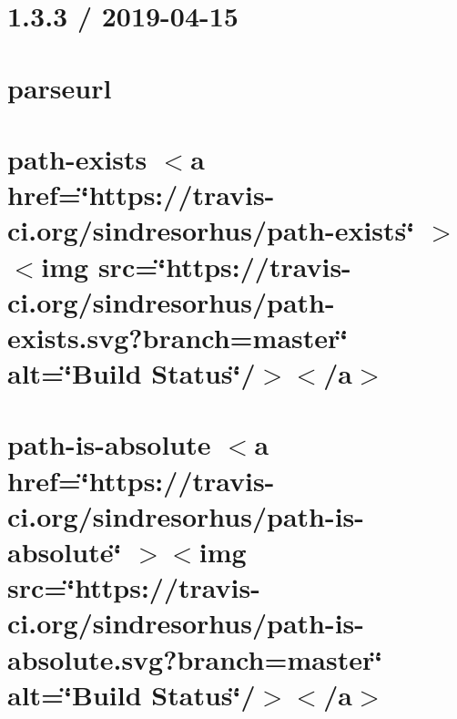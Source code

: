 \documentclass[twoside]{book}
\newcommand{\+}{\discretionary{\mbox{\scriptsize$\hookleftarrow$}}{}{}}
\begin{document}
\chapter{1.3.3 / 2019-\/04-\/15}
\label{md__c___users_vaishnavi_jadhav__desktop__developer_code_mean_stack_example_client_node_modules_parseurl__h_i_s_t_o_r_y}

\chapter{parseurl}
\label{md__c___users_vaishnavi_jadhav__desktop__developer_code_mean_stack_example_client_node_modules_parseurl__r_e_a_d_m_e}

\chapter{path-\/exists \texorpdfstring{$<$}{<}a href=\char`\"{}https\+://travis-\/ci.\+org/sindresorhus/path-\/exists\char`\"{} \texorpdfstring{$>$}{>}\texorpdfstring{$<$}{<}img src=\char`\"{}https\+://travis-\/ci.\+org/sindresorhus/path-\/exists.\+svg?branch=master\char`\"{} alt=\char`\"{}\+Build Status\char`\"{}/\texorpdfstring{$>$}{>}\texorpdfstring{$<$}{<}/a\texorpdfstring{$>$}{>}}
\label{md__c___users_vaishnavi_jadhav__desktop__developer_code_mean_stack_example_client_node_modules_path_exists_readme}

\chapter{path-\/is-\/absolute \texorpdfstring{$<$}{<}a href=\char`\"{}https\+://travis-\/ci.\+org/sindresorhus/path-\/is-\/absolute\char`\"{} \texorpdfstring{$>$}{>}\texorpdfstring{$<$}{<}img src=\char`\"{}https\+://travis-\/ci.\+org/sindresorhus/path-\/is-\/absolute.\+svg?branch=master\char`\"{} alt=\char`\"{}\+Build Status\char`\"{}/\texorpdfstring{$>$}{>}\texorpdfstring{$<$}{<}/a\texorpdfstring{$>$}{>}}
\label{md__c___users_vaishnavi_jadhav__desktop__developer_code_mean_stack_example_client_node_modules_path_is_absolute_readme}

\end{document}
